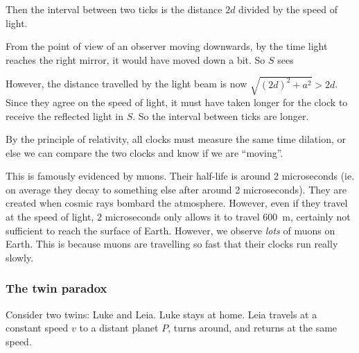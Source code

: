 \documentclass[a4paper]{article}
\begin{document}
Then the interval between two ticks is the distance $2d$ divided by the speed of light.
\begin{center}
\end{center}
From the point of view of an observer moving downwards, by the time light reaches the right mirror, it would have moved down a bit. So $S$ sees
\begin{center}
\end{center}
However, the distance travelled by the light beam is now $\sqrt{(2d)^2 + a^2} > 2d$. Since they agree on the speed of light, it must have taken longer for the clock to receive the reflected light in $S$. So the interval between ticks are longer.

By the principle of relativity, all clocks must measure the same time dilation, or else we can compare the two clocks and know if we are ``moving''.

This is famously evidenced by muons. Their half-life is around 2 microseconds (ie. on average they decay to something else after around 2 microseconds). They are created when cosmic rays bombard the atmosphere. However, even if they travel at the speed of light, 2 microseconds only allows it to travel \SI{600}{m}, certainly not sufficient to reach the surface of Earth. However, we observe \emph{lots} of muons on Earth. This is because muons are travelling so fast that their clocks run really slowly.

\subsubsection*{The twin paradox}
Consider two twins: Luke and Leia. Luke stays at home. Leia travels at a constant speed $v$ to a distant planet $P$, turns around, and returns at the same speed.
\end{document}
